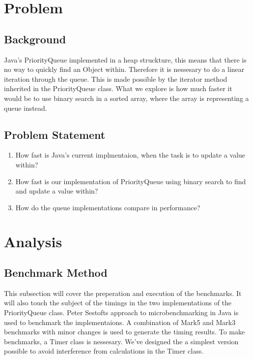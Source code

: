 \documentclass{article}
\begin{document}
\section{Problem}
\subsection{Background}
Java's PriorityQueue implemented in a heap struckture, this means that there is no way to quickly find an Object within.
Therefore it is nessesary to do a linear iteration through the queue. This is made possible by 
the iterator method inherited in the PriorityQueue class. What we explore is how much faster it would 
be to use binary search in a sorted array, where the array is representing a queue instead.  
\subsection{Problem Statement}
\begin{enumerate}
    \item How fast is Java's current implmentaion, when the task is to update a value within?
    \item How fast is our implementation of PriorityQueue using binary search to find and update a value within?
    \item How do the queue implementations compare in performance?
\end{enumerate}


\section{Analysis}
\subsection{Benchmark Method} %
This subsection will cover the preperation and execution of the benchmarks.
It will also touch the subject of the timings in the two implementations
of the PriorityQueue class. Peter Sestofts approach to microbenchmarking in 
Java \cite{microbenchmarks} is used to benchmark the implementaions. A combination of Mark5 and Mark3 
benchmarks with minor changes is used to generate the timing results. 
To make benchmarks, a Timer class is nessesary. We've designed the a simplest
version possible to avoid interference from calculations in the Timer class.
\end{document}
